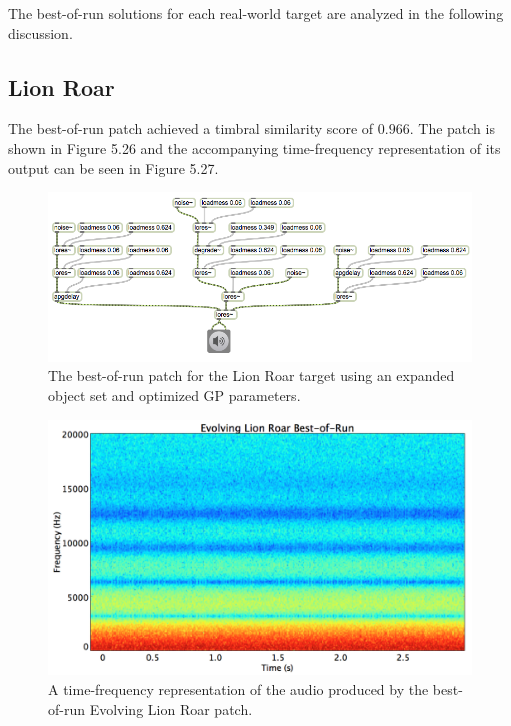 \documentclass[a4paper,12pt]{report} 	%
\numberwithin{figure}{chapter}
\numberwithin{table}{chapter}
\numberwithin{equation}{chapter}
\begin{document}
\begin{flushleft}
The best-of-run solutions for each real-world target are analyzed in the following discussion.

\subsection{Lion Roar}

The best-of-run patch achieved a timbral similarity score of $0.966$. The patch is shown in Figure 5.26 and the accompanying time-frequency representation of its output can be seen in Figure 5.27.

\begin{figure}[h!]
\begin{center}
\includegraphics[angle = 270, scale = 0.60]{Lion_Best}
\caption[Lion Roar Best-of-Run Patch]{The best-of-run patch for the Lion Roar target using an expanded object set and optimized GP parameters.}
\end{center}
\end{figure}
\begin{figure}[h!]
\begin{center}
\includegraphics[scale=0.35,width=\linewidth]{EvolvingLionRoarBestOfRunSTFT}
\caption[Best-of-Run Evolving Lion Roar Time-Frequency Representation]{A time-frequency representation of the audio produced by the best-of-run Evolving Lion Roar patch.}

\end{center}
\end{figure}
\end{flushleft}
\end{document}
